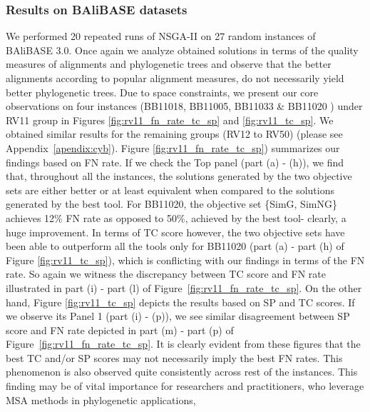 \subsubsection{Results on BAliBASE datasets}
We performed 20 repeated runs of NSGA-II on 27 random instances of BAliBASE 3.0. Once again we analyze obtained solutions in terms of the quality measures of alignments and phylogenetic trees and observe that the better alignments according to popular alignment measures, do not necessarily yield better phylogenetic trees.
Due to space constraints, we present our core observations on four instances (BB11018, BB11005, BB11033 \& BB11020 ) under RV11 group in Figures \ref{fig:rv11_fn_rate_tc_sp} and \ref{fig:rv11_tc_sp}. We obtained similar results for the remaining groups (RV12 to RV50) (please see Appendix~\ref{apendix:cyb}). Figure \ref{fig:rv11_fn_rate_tc_sp}) summarizes our findings based on FN rate. If we check the Top panel (part (a) - (h)), we find that, throughout all the instances, the solutions generated by the two objective sets are either better or at least equivalent when compared to the solutions generated by the best tool.  
For BB11020, the objective set \{SimG, SimNG\} achieves 12\% FN rate as opposed to 50\%, achieved by the best tool- clearly, a huge improvement. In terms of TC score however, the two objective sets have been able to outperform all the tools only for BB11020 (part (a) - part (h) of Figure \ref{fig:rv11_tc_sp}), which is conflicting with our findings in terms of the FN rate. So again we witness the discrepancy between TC score and FN rate illustrated in part (i) - part (l) of Figure~\ref{fig:rv11_fn_rate_tc_sp}. On the other hand, Figure \ref{fig:rv11_tc_sp} depicts the results based on SP and TC scores. If we observe its Panel 1 (part (i) - (p)), we see similar disagreement between SP score and FN rate depicted in part (m) - part (p) of Figure~\ref{fig:rv11_fn_rate_tc_sp}. It is clearly evident from these figures that the best TC and/or SP scores may not necessarily imply the best FN rates. This phenomenon is also observed quite consistently across rest of the instances. This finding may be of vital importance for researchers and practitioners, who leverage MSA methods in phylogenetic applications, 

